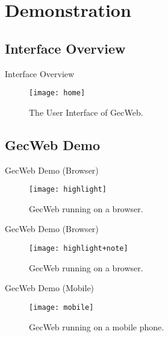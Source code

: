 \section{Demonstration}

\subsection{Interface Overview}

\begin{frame}{Interface Overview}
  \begin{figure}
    \begin{annotatedFigure}
      {\texttt{[image: home]}}
      \pause
      \pause
      \pause
      \pause
      \pause
    \end{annotatedFigure}
    \caption{The User Interface of GecWeb.}
  \end{figure}

\end{frame}

\subsection{GecWeb Demo}

\begin{frame}{GecWeb Demo (Browser)}
  \begin{figure}
    \texttt{[image: highlight]}
    \caption{GecWeb running on a browser.}
  \end{figure}
\end{frame}

\begin{frame}{GecWeb Demo (Browser)}
  \begin{figure}
    \texttt{[image: highlight+note]}
    \caption{GecWeb running on a browser.}
  \end{figure}
\end{frame}

\begin{frame}{GecWeb Demo (Mobile)}
  \begin{figure}
    \texttt{[image: mobile]}
    \caption{GecWeb running on a mobile phone.}
  \end{figure}
\end{frame}

